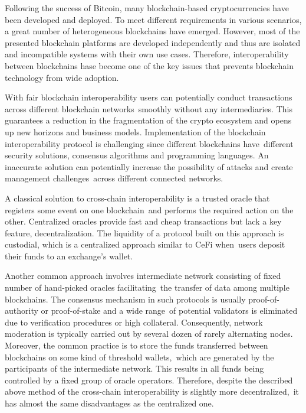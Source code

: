 Following the success of Bitcoin, many blockchain-based cryptocurrencies have been developed and deployed.
To meet different requirements in various scenarios, a great number of heterogeneous blockchains have emerged.
However, most of the presented blockchain platforms are developed independently and thus are
isolated and incompatible systems with their own use cases.
Therefore, interoperability between blockchains hase become one of the key issues
that prevents blockchain technology from wide adoption.

With fair blockchain interoperability users can potentially conduct transactions across different blockchain networks\
smoothly without any intermediaries.
This guarantees a reduction in the fragmentation of the crypto ecosystem and opens up new horizons and business models.
Implementation of the blockchain interoperability protocol is challenging since different blockchains have\
different security solutions, consensus algorithms and programming languages.
An inaccurate solution can potentially increase the possibility of attacks and create management challenges\
across different connected networks.

A classical solution to cross-chain interoperability is a trusted oracle that registers some event on one blockchain\
and performs the required action on the other.
Centralized oracles provide fast and cheap transactions but lack a key feature, decentralization.
The liquidity of a protocol built on this approach is custodial, which is a centralized approach similar to CeFi when\
users deposit their funds to an exchange's wallet.

Another common approach involves intermediate network consisting of fixed number of hand-picked oracles facilitating\
the transfer of data among multiple blockchains.
The consensus mechanism in such protocols is usually proof-of-authority or proof-of-stake and a wide range\
of potential validators is eliminated due to verification procedures or high collateral.
Consequently, network moderation is typically carried out by several dozen of rarely alternating nodes.
Moreover, the common practice is to store the funds transferred between blockchains on some kind of threshold wallets,\
which are generated by the participants of the intermediate network.
This results in all funds being controlled by a fixed group of oracle operators.
Therefore, despite the described above method of the cross-chain interoperability is slightly more decentralized,\
it has almost the same disadvantages as the centralized one.
